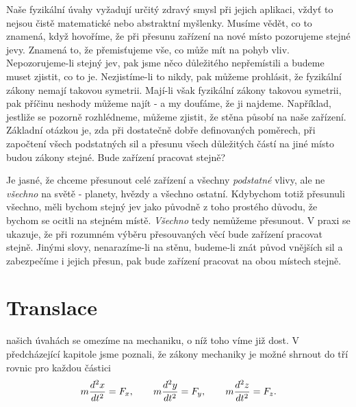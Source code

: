     Naše fyzikální úvahy vyžadují určitý zdravý smysl při jejich aplikaci, vždyť to nejsou čistě 
    matematické nebo abstraktní myšlenky. Musíme vědět, co to znamená, když hovoříme, že při 
    přesunu zařízení na nové místo pozorujeme stejné jevy. Znamená to, že přemisťujeme vše, co může 
    mít na pohyb vliv. Nepozorujeme-li stejný jev, pak jsme něco důležitého nepřemístili a budeme 
    muset zjistit, co to je. Nezjistíme-li to nikdy, pak můžeme prohlásit, že fyzikální zákony 
    nemají takovou symetrii. Mají-li však fyzikální zákony takovou symetrii, pak příčinu neshody 
    můžeme najít - a my doufáme, že ji najdeme. Například, jestliže se pozorně rozhlédneme, můžeme 
    zjistit, že stěna působí na naše zařízení. Základní otázkou je, zda při dostatečně dobře 
    definovaných poměrech, při započtení všech podstatných sil a přesunu všech důležitých částí na 
    jiné místo budou zákony stejné. Bude zařízení pracovat stejně?
    
    Je jasné, že chceme přesunout celé zařízení a všechny \emph{podstatné} vlivy, ale ne 
    \emph{všechno} na světě - planety, hvězdy a všechno ostatní. Kdybychom totiž přesunuli všechno, 
    měli bychom stejný jev jako původně z toho prostého důvodu, že bychom se ocitli na stejném 
    místě. \emph{Všechno} tedy nemůžeme přesunout. V praxi se ukazuje, že při rozumném výběru 
    přesouvaných věcí bude zařízení pracovat stejně. Jinými slovy, nenarazíme-li na stěnu, 
    budeme-li znát původ vnějších sil a zabezpečíme i jejich přesun, pak bude zařízení pracovat na 
    obou místech stejně.
    
  \section{Translace}
    našich úvahách se omezíme na mechaniku, o níž toho víme již dost. V předcházející kapitole 
    jsme poznali, že zákony mechaniky je možné shrnout do tří rovnic pro každou částici
    \begin{equation}\label{FYZ:eq145}
      m\dfrac{d^2 x}{d t^2} = F_x, \qquad
      m\dfrac{d^2 y}{d t^2} = F_y, \qquad
      m\dfrac{d^2 z}{d t^2} = F_z.
    \end{equation}

